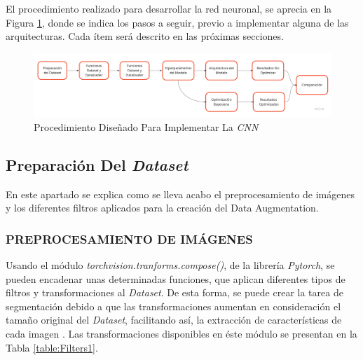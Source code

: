 	El procedimiento realizado para desarrollar la red neuronal, se aprecia en la Figura \ref{fig:procedimiento}, donde se indica los pasos a seguir, previo a implementar alguna de las arquitecturas. Cada ítem será descrito en las próximas secciones.  

	\begin{figure}[ht]
		\centering
		\includegraphics[scale=0.15]{Figs/procedimiento.jpg}
		\caption{Procedimiento Diseñado Para Implementar La \textit{CNN}}
		\label{fig:procedimiento}
	\end{figure}	


		\newpage
		\subsection{Preparación Del \textit{Dataset}}
		En este apartado se explica como se lleva acabo el preprocesamiento de imágenes y los diferentes filtros aplicados para la creación del Data Augmentation.
			\subsubsection{PREPROCESAMIENTO DE IMÁGENES}

			Usando el módulo \textit{torchvision.tranforms.compose()}, de la librería \textit{Pytorch}, se pueden encadenar unas determinadas funciones, que aplican diferentes tipos de filtros y transformaciones al \textit{Dataset}. De esta forma, se puede crear la tarea de segmentación debido a que las transformaciones aumentan en consideración el tamaño original del \textit{Dataset}, facilitando así, la extracción de características de cada imagen \cite{Pytorch}. Las transformaciones disponibles en éste módulo se presentan en la Tabla \ref{table:Filters1}.
			
